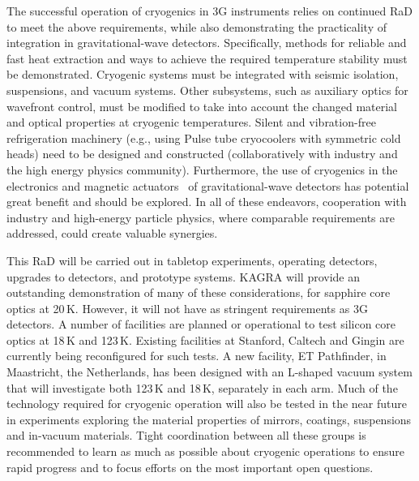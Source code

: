 The successful operation of cryogenics in \ac{3G} instruments relies on continued \ac{RaD}
to meet the above requirements, while also demonstrating the practicality of integration in gravitational-wave detectors. Specifically, methods for reliable and fast heat extraction and ways to achieve the required temperature stability must be demonstrated. Cryogenic systems must be integrated with seismic isolation, suspensions, and vacuum systems.  
Other subsystems, such as auxiliary optics for wavefront control, must be modified to take into account the changed material and optical properties at cryogenic temperatures. Silent and vibration-free refrigeration machinery (e.g., using Pulse tube cryocoolers with symmetric cold heads) need to be designed and constructed (collaboratively with industry and the high energy physics community). Furthermore, the use of cryogenics in the electronics and magnetic actuators~\cite{cryo:OSEM} of gravitational-wave detectors has potential great benefit and should be explored. In all of these endeavors, cooperation with industry and high-energy particle physics, where comparable requirements are addressed, could create valuable synergies. 


This \ac{RaD} will be carried out in tabletop experiments, operating detectors, upgrades to detectors, and prototype systems. \ac{KAGRA} will provide an outstanding demonstration of many of these considerations, for sapphire core optics at 20\,K. However, it will not have as stringent requirements as \ac{3G} detectors.
A number of facilities are planned or operational to test silicon core optics at 18\,K and 123\,K. 
Existing facilities at Stanford, Caltech and Gingin are currently being reconfigured for such tests. A new facility, ET Pathfinder, in Maastricht, the Netherlands, has been designed with an L-shaped vacuum system that will investigate both 123\,K and  18\,K, separately in each arm. Much of the technology required for cryogenic operation will also be tested in the near future in experiments exploring the material properties of mirrors, coatings, suspensions and in-vacuum materials. Tight coordination between all these groups is recommended to learn as much as possible about cryogenic operations to ensure rapid progress and to focus efforts on the most important open questions.

